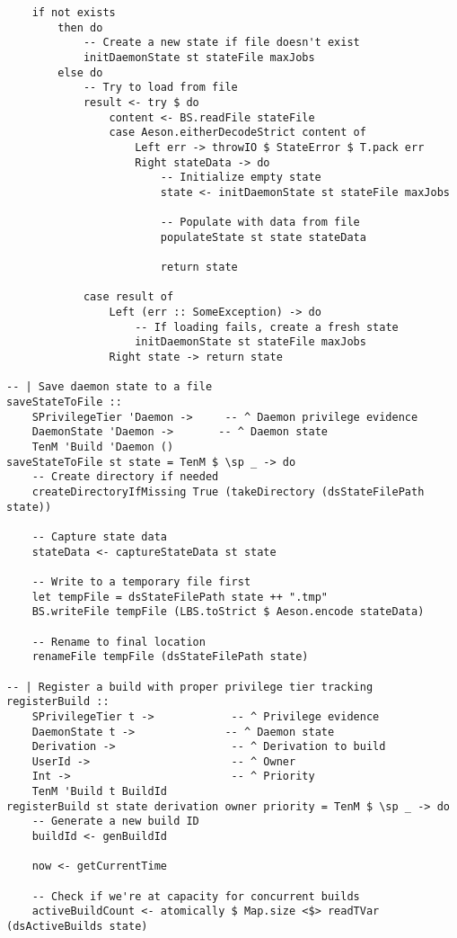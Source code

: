 \documentclass{article}
\begin{document}
\begin{tcolorbox}[title=Ten/Daemon/State.hs Changes]
\begin{verbatim}
    if not exists
        then do
            -- Create a new state if file doesn't exist
            initDaemonState st stateFile maxJobs
        else do
            -- Try to load from file
            result <- try $ do
                content <- BS.readFile stateFile
                case Aeson.eitherDecodeStrict content of
                    Left err -> throwIO $ StateError $ T.pack err
                    Right stateData -> do
                        -- Initialize empty state
                        state <- initDaemonState st stateFile maxJobs

                        -- Populate with data from file
                        populateState st state stateData

                        return state

            case result of
                Left (err :: SomeException) -> do
                    -- If loading fails, create a fresh state
                    initDaemonState st stateFile maxJobs
                Right state -> return state

-- | Save daemon state to a file
saveStateToFile ::
    SPrivilegeTier 'Daemon ->     -- ^ Daemon privilege evidence
    DaemonState 'Daemon ->       -- ^ Daemon state
    TenM 'Build 'Daemon ()
saveStateToFile st state = TenM $ \sp _ -> do
    -- Create directory if needed
    createDirectoryIfMissing True (takeDirectory (dsStateFilePath state))

    -- Capture state data
    stateData <- captureStateData st state

    -- Write to a temporary file first
    let tempFile = dsStateFilePath state ++ ".tmp"
    BS.writeFile tempFile (LBS.toStrict $ Aeson.encode stateData)

    -- Rename to final location
    renameFile tempFile (dsStateFilePath state)

-- | Register a build with proper privilege tier tracking
registerBuild ::
    SPrivilegeTier t ->            -- ^ Privilege evidence
    DaemonState t ->              -- ^ Daemon state
    Derivation ->                  -- ^ Derivation to build
    UserId ->                      -- ^ Owner
    Int ->                         -- ^ Priority
    TenM 'Build t BuildId
registerBuild st state derivation owner priority = TenM $ \sp _ -> do
    -- Generate a new build ID
    buildId <- genBuildId

    now <- getCurrentTime

    -- Check if we're at capacity for concurrent builds
    activeBuildCount <- atomically $ Map.size <$> readTVar (dsActiveBuilds state)


\end{verbatim}
\end{tcolorbox}
\end{document}
